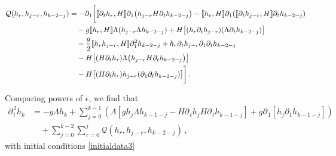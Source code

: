 \documentclass[11pt]{article}
\theoremstyle{plain}
\theoremstyle{definition}
\theoremstyle{definition}
\def\Q{{\mathcal Q}}
\def\p{\text{\bf\emph{p}}}
\def\bp{{\partial_1}}
\def\p{{\partial\hspace{1pt}}}
\def\comm#1#2{{\llbracket#1,#2\rrbracket}}
\def\smallexp#1{{\text{\small #1}}}
\def\dfrac#1#2{\smallexp{$\displaystyle{}\frac{#1}{#2}$}}
\def\hinit{h_{\operatorname{init}}}
\def\htinit{{\dot h}_{\operatorname{init}}}
\begin{document}
\begin{align}
\Q(h_r,h_{j-r},h_{k-2-j})&=- \p_{\!1}\bigg{[} \comm{\p_{\!t} h_r}{H} \p_{\!1} \big(h_{j-r} H \p_{\!t} h_{k-2-j} \big)- \comm{h_r}{H} \p_{\!1} (\comm{\p_{\!t} h_{j-r}}{H} \p_{\!t} h_{k-2-j})  \nonumber\\
&\quad - g \comm{h_r}{H} \Lambda (h_{j-r} \Lambda h_{k-2-j}) + H \big[(h_r \p_{\!t} h_{j-r}) (\Lambda \p_{\!t}h_{k-2-j})\big] \nonumber\\
&\quad- \frac{g}{2}\comm{h_rh_{j-r}}{H}\partial_1^2h_{k-2-j}+h_r \p_{\!t} h_{j-r} \partial_1 \p_{\!t} h_{k-2-j}  \nonumber\\
&\quad  -H\big[(H \p_{\!t} h_r) \Lambda \big(h_{j-r} H \p_{\!t} h_{k-2-j}\big)\big]\nonumber\\
&\quad -H\big[(H \p_{\!t} h_r)  h_{j-r} (\p_{\!1}\p_{\!t} h_{k-2-j})\big]\bigg{]}
\,.\label{eq:Q}
\end{align}


Comparing powers of $\epsilon$, we find that
\begin{align}\label{eq:uk2}
\p^2_{\!t}h_{k}&=-g\Lambda h_k
+ \sum_{j=0}^{k-1}\left(
\Lambda \left[gh_{j}\Lambda h_{k-1-j}  - H\p_{\!t}h_{j}H\p_{\!t}h_{k-1-j}\right]  + g\p_{\!1} \left[ h_{j}\bp h_{k-1-j}\right]
\right)\nonumber\\
&\quad +\sum_{j=0}^{k-2}\sum_{r=0}^{j}\Q(h_r,h_{j-r},h_{k-2-j})\,,
\end{align}
with initial conditions \eqref{initialdata3}
\end{document}
